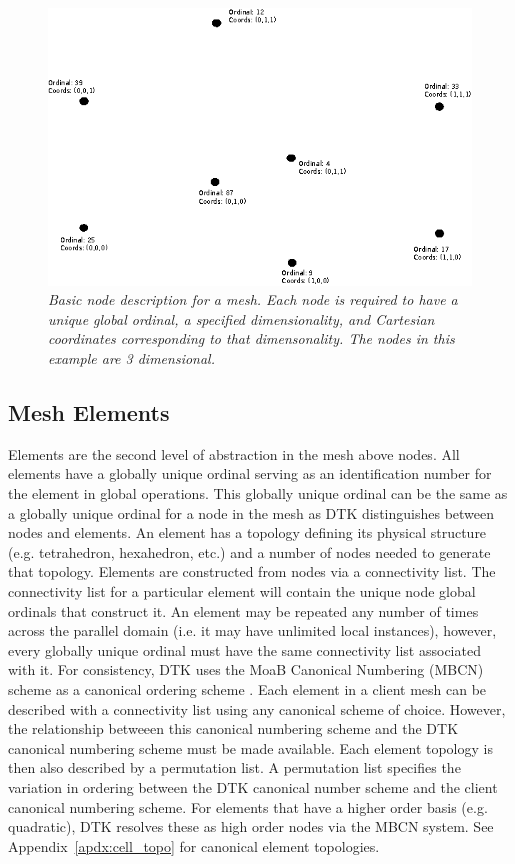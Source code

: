 \documentclass[letterpaper,12pt]{article}
\begin{document}
\begin{figure}[htpb!]
  \centering
  \includegraphics[width=5in]{hex_nodes.eps}
  \caption{\sl Basic node description for a mesh. Each node is
    required to have a unique global ordinal, a specified
    dimensionality, and Cartesian coordinates corresponding to that
    dimensonality. The nodes in this example are 3 dimensional.}
  \label{fig:mesh_nodes}
\end{figure}

\subsection{Mesh Elements}\label{subsec:elements}
Elements are the second level of abstraction in the mesh above
nodes. All elements have a globally unique ordinal serving as an
identification number for the element in global operations. This
globally unique ordinal can be the same as a globally unique ordinal
for a node in the mesh as DTK distinguishes between nodes and
elements. An element has a topology defining its physical structure
(e.g. tetrahedron, hexahedron, etc.) and a number of nodes needed to
generate that topology. Elements are constructed from nodes via a
connectivity list. The connectivity list for a particular element will
contain the unique node global ordinals that construct it. An element
may be repeated any number of times across the parallel domain
(i.e. it may have unlimited local instances), however, every globally
unique ordinal must have the same connectivity list associated with
it. For consistency, DTK uses the MoaB Canonical Numbering (MBCN)
scheme as a canonical ordering scheme \cite{Tautges_2009}. Each
element in a client mesh can be described with a connectivity list
using any canonical scheme of choice. However, the relationship
betweeen this canonical numbering scheme and the DTK canonical
numbering scheme must be made available. Each element topology is then
also described by a permutation list. A permutation list specifies the
variation in ordering between the DTK canonical number scheme and the
client canonical numbering scheme. For elements that have a higher
order basis (e.g. quadratic), DTK resolves these as high order nodes
via the MBCN system. See Appendix~\ref{apdx:cell_topo} for canonical
element topologies.
\end{document}
